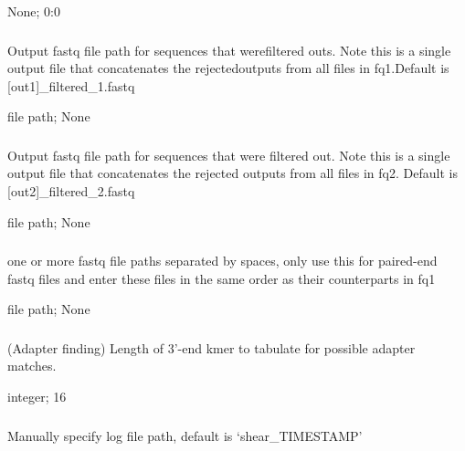 \documentclass[letterpaper,11pt,english]{sphinxmanual}
\begin{document}
 None;  0:0


\subsubsection{}
\label{\detokenize{prog_desc:filt1}}
 Output fastq file path for sequences that werefiltered outs. Note this is a single output file that concatenates the rejectedoutputs from all files in \textendash{}fq1.Default is {[}\textendash{}out1{]}\_filtered\_1.fastq

 file path;  None


\subsubsection{}
\label{\detokenize{prog_desc:filt2}}
 Output fastq file path for sequences that were filtered out. Note this is a single output file that concatenates the rejected outputs from all files in \textendash{}fq2. Default is {[}\textendash{}out2{]}\_filtered\_2.fastq

 file path;  None


\subsubsection{}
\label{\detokenize{prog_desc:id5}}
 one or more fastq file paths separated by spaces, only use this for paired-end fastq files and enter these files in the same order as their counterparts in \textendash{}fq1

 file path;  None


\subsubsection{}
\label{\detokenize{prog_desc:k-adapter-end-klength}}
 (Adapter finding) Length of 3’-end kmer to tabulate for possible adapter matches.

 integer;  16


\subsubsection{}
\label{\detokenize{prog_desc:log-path}}
 Manually specify log file path, default is ‘shear\_TIMESTAMP’
\end{document}
